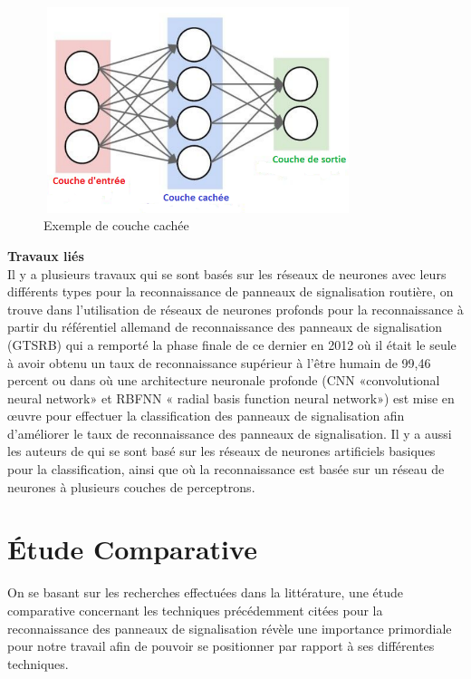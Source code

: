 \begin{figure}[h!]
      \centering
      \includegraphics[width=9cm,height=6cm]{images/moddl.png}
    \caption{Exemple de couche cachée}
    \label{fig:couche}
\end{figure}
\newpage
{\textbf{Travaux liés}}\\

Il y a plusieurs travaux qui se sont basés sur les réseaux de neurones avec leurs différents types pour la reconnaissance de panneaux de signalisation routière, on trouve  dans \cite{39} l’utilisation de  réseaux de neurones profonds pour la reconnaissance à partir du référentiel allemand de reconnaissance des panneaux de signalisation (GTSRB) qui a remporté la phase finale de ce dernier en 2012 où il était le seule à avoir obtenu un taux de reconnaissance supérieur à l'être humain de 99,46 percent ou dans \cite{40} où une architecture neuronale profonde (CNN «convolutional neural network» et RBFNN « radial basis function neural network») est mise en œuvre pour effectuer la classification des panneaux de signalisation afin d'améliorer le taux de reconnaissance des panneaux de signalisation. Il y a aussi les auteurs de \cite{41} qui se sont basé sur les réseaux de neurones artificiels basiques pour la classification, ainsi que \cite{42} où la reconnaissance est basée sur un réseau de neurones à plusieurs couches de perceptrons.\\
\section {Étude Comparative}
On se basant sur les recherches effectuées dans la littérature, une étude comparative concernant les techniques précédemment citées pour la reconnaissance des panneaux de signalisation révèle une importance primordiale pour notre travail afin de pouvoir se positionner par rapport à ses différentes techniques.\\

